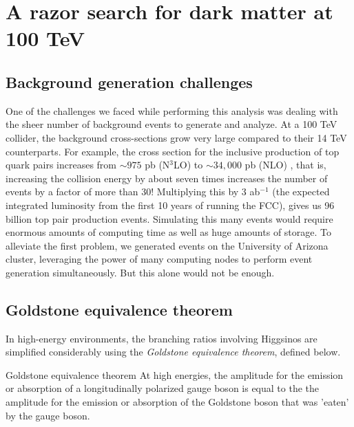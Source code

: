 \chapter{A razor search for dark matter at 100 TeV}

\section{Background generation challenges}
One of the challenges we faced while performing this analysis was dealing with the sheer number of background events to generate and analyze. At a 100 TeV collider, the background cross-sections grow very large compared to their 14 TeV counterparts. For example, the cross section for the inclusive production of top quark pairs increases from $\sim975$ pb (N$^{3}$LO) to $\sim34,000$ pb (NLO) \citep{Mangano:2016jyj}, that is, increasing the collision energy by about seven times increases the number of events by a factor of more than 30! Multiplying this by 3 ab$^{-1}$ (the expected integrated luminosity from the first 10 years of running the FCC), gives us 96 billion top pair production events. Simulating this many events would require enormous amounts of computing time as well as huge amounts of storage. To alleviate the first problem, we generated events on the University of Arizona cluster, leveraging the power of many computing nodes to perform event generation simultaneously. But this alone would not be enough. 
\section{Goldstone equivalence theorem}

In high-energy environments, the branching ratios involving Higgsinos are simplified considerably using the \emph{Goldstone equivalence theorem}, defined below.

\begin{theorem}{Goldstone equivalence theorem}
At high energies, the amplitude for the emission or absorption of a longitudinally polarized gauge boson is equal to the the amplitude for the emission or absorption of the Goldstone boson that was 'eaten' by the gauge boson.
\end{theorem}
